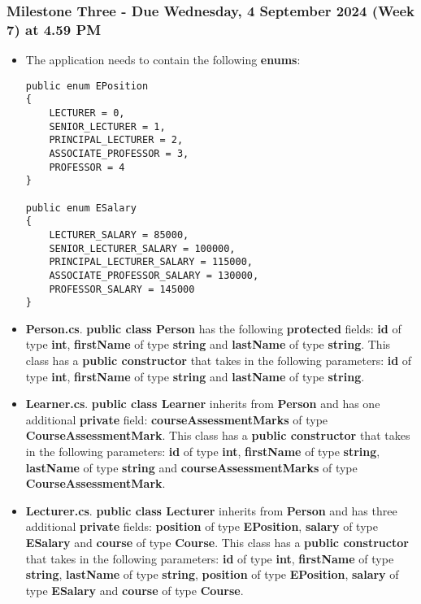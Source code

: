 \documentclass{article}
\begin{document}
\subsubsection*{Milestone Three - Due Wednesday, 4 September 2024 (Week 7) at 4.59 PM}

\begin{itemize}
    \item The application needs to contain the following \textbf{enums}:
    \begin{verbatim}
public enum EPosition
{
    LECTURER = 0,
    SENIOR_LECTURER = 1,
    PRINCIPAL_LECTURER = 2,
    ASSOCIATE_PROFESSOR = 3,
    PROFESSOR = 4
}
            
public enum ESalary
{
    LECTURER_SALARY = 85000,
    SENIOR_LECTURER_SALARY = 100000,
    PRINCIPAL_LECTURER_SALARY = 115000,
    ASSOCIATE_PROFESSOR_SALARY = 130000,
    PROFESSOR_SALARY = 145000
}
    \end{verbatim}
    \item \textbf{Person.cs}. \textbf{public class Person} has the following \textbf{protected} fields: \textbf{id} of type \textbf{int}, \textbf{firstName} of type \textbf{string} and \textbf{lastName} of type \textbf{string}. This class has a \textbf{public constructor} that takes in the following parameters: \textbf{id} of type \textbf{int}, \textbf{firstName} of type \textbf{string} and \textbf{lastName} of type \textbf{string}.
    \item \textbf{Learner.cs}. \textbf{public class Learner} inherits from \textbf{Person} and has one additional \textbf{private} field: \textbf{courseAssessmentMarks} of type \textbf{CourseAssessmentMark}. This class has a \textbf{public constructor} that takes in the following parameters: \textbf{id} of type \textbf{int}, \textbf{firstName} of type \textbf{string}, \textbf{lastName} of type \textbf{string} and \textbf{courseAssessmentMarks} of type \textbf{CourseAssessmentMark}. 
    \item \textbf{Lecturer.cs}. \textbf{public class Lecturer} inherits from \textbf{Person} and has three additional \textbf{private} fields: \textbf{position} of type \textbf{EPosition}, \textbf{salary} of type \textbf{ESalary} and \textbf{course} of type \textbf{Course}. This class has a \textbf{public constructor} that takes in the following parameters: \textbf{id} of type \textbf{int}, \textbf{firstName} of type \textbf{string}, \textbf{lastName} of type \textbf{string}, \textbf{position} of type \textbf{EPosition}, \textbf{salary} of type \textbf{ESalary} and \textbf{course} of type \textbf{Course}. 
\end{itemize}
\end{document}
